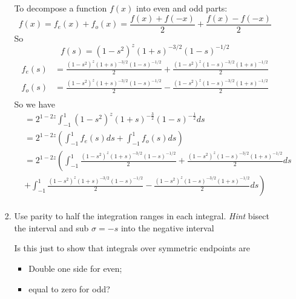 \documentclass{X:/Documents/Coding/Latex/myassignment}
\begin{document}
\begin{enumerate}
\begin{enumerate}
\begin{enumerate}
	 	To decompose a function $f(x)$ into even and odd parts:
	 	\[f(x) = f_e(x) + f_o(x) = \frac{f(x) + f(-x)}{2} + \frac{f(x) - f(-x)}{2}\]
	 	So
	 	\[f(s) = (1-s^2)^z (1+s)^{-3/2} (1-s)^{-1/2}\]
	 	\begin{align*}
	 		f_e(s) &= \frac{(1-s^2)^z (1+s)^{-3/2} (1-s)^{-1/2}}{2 } + \frac{(1-s^2)^z (1-s)^{-3/2} (1+s)^{-1/2}}{2}\\
	 		f_o(s) &= \frac{(1-s^2)^z (1+s)^{-3/2} (1-s)^{-1/2}}{2 } - \frac{(1-s^2)^z (1-s)^{-3/2} (1+s)^{-1/2}}{2}\\
	 	\end{align*}
	 	So we have
	 	\begin{align*}
	 		&=  2^{1-2z} \int_{-1}^{1} \left(1-s^2\right)^z  \left(1+s\right)^{-\frac32}\left(1-s\right)^{-\frac12} ds\\
	 		&=2^{1-2z} \left(\int_{-1}^{1} f_e(s) ds + \int_{-1}^1 f_o(s) ds\right)\\
	 		&=2^{1-2z} \left(\int_{-1}^{1} \frac{(1-s^2)^z (1+s)^{-3/2} (1-s)^{-1/2}}{2 } + \frac{(1-s^2)^z (1-s)^{-3/2} (1+s)^{-1/2}}{2} ds\right. 
	 		\\&+ \left. \int_{-1}^1 \frac{(1-s^2)^z (1+s)^{-3/2} (1-s)^{-1/2}}{2 } - \frac{(1-s^2)^z (1-s)^{-3/2} (1+s)^{-1/2}}{2} ds\right)\\
	 	\end{align*}


	 	\item Use parity to half the integration ranges in each integral. \textit{Hint} bisect the interval and sub $\sigma = -s$ into the negative interval

	 	Is this just to show that integrals over symmetric endpoints are
	 	\begin{itemize}
	 		\item Double one side for even;
	 		\item equal to zero for odd?
	 	\end{itemize}


\end{enumerate}
\end{enumerate}
\end{enumerate}
\end{document}
